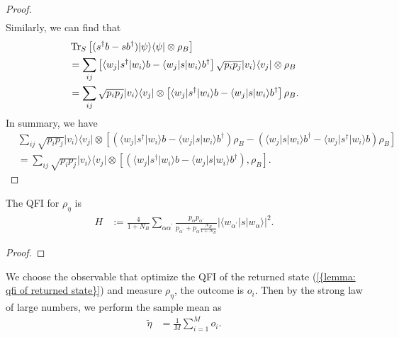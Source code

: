\documentclass[../../note.tex]{subfiles}
\begin{document}
\begin{proof}
\begin{align}
    \end{align}
    Similarly, we can find that 
    \begin{align}
        &\operatorname{Tr}_S\left[(s^\dagger b - s b^\dagger)\vert \psi \rangle \langle \psi \vert \otimes \rho_B\right]\\ 
        &= \sum_{ij} \left[\langle w_j \vert s^\dagger \vert w_i \rangle b - \langle w_j \vert s \vert w_i \rangle b^\dagger \right] \sqrt{p_i p_j} \vert v_i \rangle \langle v_j \vert \otimes \rho_B \\
        &= \sum_{ij} \sqrt{p_i p_j} \vert v_i \rangle \langle v_j \vert \otimes \left[\langle w_j \vert s^\dagger \vert w_i \rangle b - \langle w_j \vert s \vert w_i \rangle b^\dagger\right]\rho_B.
    \end{align}
    In summary, we have
    \begin{align}
        &\sum_{ij} \sqrt{p_i p_j} \vert v_i \rangle \langle v_j \vert \otimes \left[\left(\langle w_j \vert s^\dagger \vert w_i \rangle b - \langle w_j \vert s \vert w_i \rangle b^\dagger\right) \rho_B -  \left(\langle w_j \vert s \vert w_i \rangle b^\dagger - \langle w_j \vert s^\dagger \vert w_i \rangle b \right) \rho_B \right] \\
        &= \sum_{ij} \sqrt{p_i p_j} \vert v_i \rangle \langle v_j \vert \otimes \left[\left(\langle w_j \vert s^\dagger \vert w_i \rangle b - \langle w_j \vert s \vert w_i \rangle b^\dagger\right), \rho_B \right].
    \end{align}
\end{proof}

\begin{lemma}
    \label{lemma: qfi of returned state}
    The QFI for $\rho_{\eta}$ is
    \begin{align}
        H
        &:= \frac{4}{1+N_B} \sum_{\alpha \alpha^\prime} \frac{p_\alpha p_{\alpha^\prime}}{p_{\alpha^\prime} + p_{\alpha} \frac{N_B}{1+N_B}} \vert \langle w_{\alpha^\prime} \vert s \vert w_{\alpha} \rangle \vert^2.
    \end{align}
\end{lemma}
\begin{proof}
    
\end{proof}

We choose the observable that optimize the QFI of the returned state (\ref{{lemma: qfi of returned state}}) and measure $\rho_{\eta}$, the outcome is $o_i$. Then by the strong law of large numbers, we perform the sample mean as
\begin{align}
    \label{eq: estimation of eta}
    \tilde{\eta}
    &= \frac{1}{M} \sum_{i=1}^{M} o_i.
\end{align}
\end{document}
